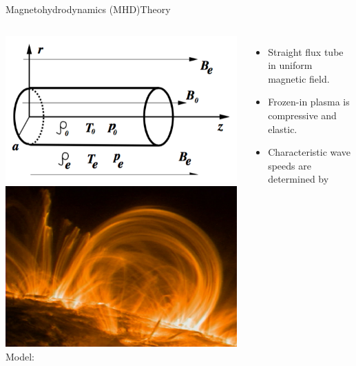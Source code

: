 \documentclass[table]{beamer}
\begin{document}
\begin{frame}{Magnetohydrodynamics (MHD)}{Theory}
    \begin{columns}
        \includegraphics[width=\textwidth]{cylinder.png}\\
        \includegraphics[width=\textwidth]{loop.jpg}
        Model:
        \begin{itemize}
            \item Straight flux tube in uniform magnetic field.
            \item Frozen-in plasma is compressive and elastic.
            \item Characteristic wave speeds are determined by

\end{itemize}
\end{columns}
\end{frame}
\end{document}
